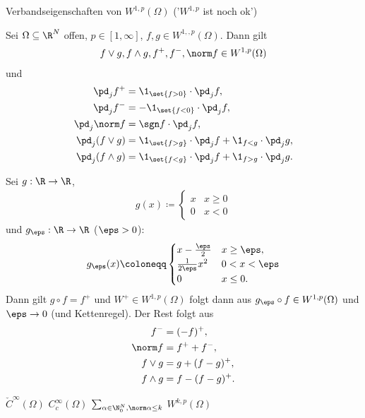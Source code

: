 \begin{theorem}Verbandseigenschaften von $W^{1, p}(\Omega)$ ('$W^{1, p}$ ist noch ok')

Sei $\Omega\subseteq \R^{N}$ offen, $p \in [1, \infty]$, $f, g \in W^{1, ,p}(\Omega)$. Dann gilt
\begin{align*}
  f \vee g, f \wedge g, f^{+}, f^{-}, \norm f \in W^{1, p}(\Omega)
\end{align*}
und
\begin{align*}
  \pd_{j}f^{+} &= \1_{\set{f > 0}} \cdot \pd_{j}f,\\
  \pd_{j}f^{-} &= -\1_{\set{f < 0}} \cdot \pd_{j}f,\\
\pd_{j} \norm f &= \sgn f \cdot \pd_{j} f,\\
\pd_{j} (f \vee g) &= \1_{\set{f > g}} \cdot \pd_{j} f + \1_{f < g} \cdot \pd_{j} g,\\
\pd_{j} (f \wedge g) &= \1_{\set{f < g}} \cdot \pd_{j} f + \1_{f > g} \cdot \pd_{j} g. 
\end{align*}
\end{theorem}
\begin{beweis}
  Sei $g: \R \to \R$,
  \begin{align*}
    g(x) \coloneqq
    \begin{cases}
      x & x \geq 0\\ 0 & x < 0
    \end{cases}
  \end{align*}
und $g_{\eps}: \R\to \R$ ($\eps >0$):
\begin{align*}
   g_{\eps}(x) \coloneqq
    \begin{cases}
      x  - \frac \eps 2 & x \geq \eps,\\
      \frac 1{2\eps} x^{2} &0 < x <\eps\\
      0 & x \leq 0.
    \end{cases} 
\end{align*}
Dann gilt $g \circ f = f^{+}$ und $W^{+} \in W^{1, p}(\Omega)$ folgt dann aus $ g_{\eps}\circ f \in W^{1, p}(\Omega)$ und $\eps \to 0$ (und Kettenregel). Der Rest folgt aus 
\begin{align*}
  f^{-} &= (-f)^{+},\\
\norm f &= f^{+} + f^{-}, \\
f \vee g &= g + (f-g)^{+}, \\
f \wedge g &= f - (f - g)^{+}.
\end{align*}

\end{beweis}
$\check C^{\infty}(\Omega)$
$C_{c}^{\infty}(\Omega)$
$\sum_{\alpha \in \N_{0}^{N}, \norm \alpha \leq k}$
$W^{k, p}(\Omega)$


